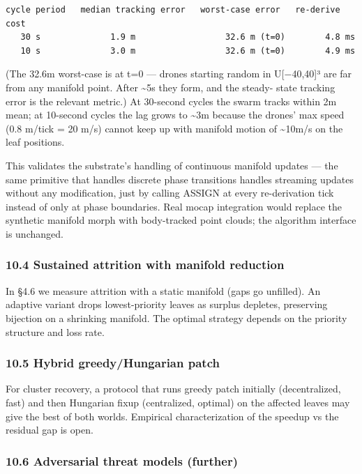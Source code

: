 \begin{verbatim}
cycle period   median tracking error   worst-case error   re-derive cost
   30 s              1.9 m                  32.6 m (t=0)        4.8 ms
   10 s              3.0 m                  32.6 m (t=0)        4.9 ms
\end{verbatim}

(The 32.6m worst-case is at t=0 --- drones starting random in
U{[}−40,40{]}³ are far from any manifold point. After \textasciitilde5s
they form, and the steady- state tracking error is the relevant metric.)
At 30-second cycles the swarm tracks within 2m mean; at 10-second cycles
the lag grows to \textasciitilde3m because the drones' max speed (0.8
m/tick = 20 m/s) cannot keep up with manifold motion of
\textasciitilde10m/s on the leaf positions.

This validates the substrate's handling of continuous manifold updates
--- the same primitive that handles discrete phase transitions handles
streaming updates without any modification, just by calling ASSIGN at
every re-derivation tick instead of only at phase boundaries. Real mocap
integration would replace the synthetic manifold morph with body-tracked
point clouds; the algorithm interface is unchanged.

\subsubsection{10.4 Sustained attrition with manifold
reduction}\label{sustained-attrition-with-manifold-reduction}

In §4.6 we measure attrition with a static manifold (gaps go unfilled).
An adaptive variant drops lowest-priority leaves as surplus depletes,
preserving bijection on a shrinking manifold. The optimal strategy
depends on the priority structure and loss rate.

\subsubsection{10.5 Hybrid greedy/Hungarian
patch}\label{hybrid-greedyhungarian-patch}

For cluster recovery, a protocol that runs greedy patch initially
(decentralized, fast) and then Hungarian fixup (centralized, optimal) on
the affected leaves may give the best of both worlds. Empirical
characterization of the speedup vs the residual gap is open.

\subsubsection{10.6 Adversarial threat models
(further)}\label{adversarial-threat-models-further}

